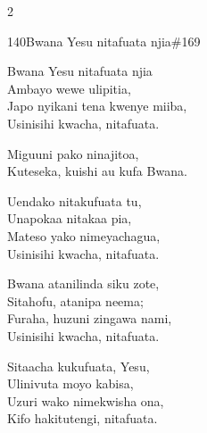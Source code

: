 \documentclass{article}
\begin{document}
\begin{multicols}{2}
\begin{hymn}{140}{Bwana Yesu nitafuata njia}{\#169}
\begin{stanza}
Bwana Yesu nitafuata njia\\
Ambayo wewe ulipitia,\\
Japo nyikani tena kwenye miiba,\\
Usinisihi kwacha, nitafuata.
\end{stanza}
\begin{chorus}
Miguuni pako ninajitoa,\\
Kuteseka, kuishi au kufa Bwana.
\end{chorus}
\begin{stanza}
Uendako nitakufuata tu,\\
Unapokaa nitakaa pia,\\
Mateso yako nimeyachagua,\\
Usinisihi kwacha, nitafuata.
\end{stanza}
\begin{stanza}
Bwana atanilinda siku zote,\\
Sitahofu, atanipa neema;\\
Furaha, huzuni zingawa nami,\\
Usinisihi kwacha, nitafuata.
\end{stanza}
\begin{stanza}
Sitaacha kukufuata, Yesu,\\
Ulinivuta moyo kabisa,\\
Uzuri wako nimekwisha ona,\\
Kifo hakitutengi, nitafuata.
\end{stanza}
\end{hymn}


\end{multicols}
\end{document}
